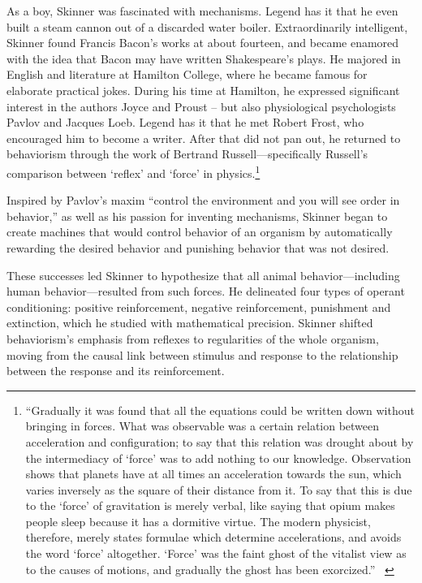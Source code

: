 \begin{refsection}
As a boy, Skinner was fascinated with mechanisms. Legend has it that he even built a steam cannon out of a discarded water boiler. Extraordinarily intelligent, Skinner found Francis Bacon's works at about fourteen, and became enamored with the idea that Bacon may have written Shakespeare's plays. He majored in English and literature at Hamilton College, where he became famous for elaborate practical jokes. During his time at Hamilton, he expressed significant interest in the authors Joyce and Proust – but also physiological psychologists Pavlov and Jacques Loeb. Legend has it that he met Robert Frost, who encouraged him to become a writer. After that did not pan out, he returned to behaviorism through the work of Bertrand Russell---specifically Russell's comparison between `reflex' and `force' in physics.\footnote{``Gradually it was found that all the equations could be written down without bringing in forces. What was observable was a certain relation between acceleration and configuration; to say that this relation was drought about by the intermediacy of `force' was to add nothing to our knowledge. Observation shows that planets have at all times an acceleration towards the sun, which varies inversely as the square of their distance from it. To say that this is due to the `force' of gravitation is merely verbal, like saying that opium makes people sleep because it has a dormitive virtue. The modern physicist, therefore, merely states formulae which determine accelerations, and avoids the word `force' altogether. `Force' was the faint ghost of the vitalist view as to the causes of motions, and gradually the ghost has been exorcized.'' ~\citep[p 495]{Russell:2013wy}}

Inspired by Pavlov's maxim ``control the environment and you will see order in behavior,'' as well as his passion for inventing mechanisms, Skinner began to create machines that would control behavior of an organism by automatically rewarding the desired behavior and punishing behavior that was not desired.

These successes led Skinner to hypothesize that all animal behavior---including human behavior---resulted from such forces. He delineated four types of operant conditioning: positive reinforcement, negative reinforcement, punishment and extinction, which he studied with mathematical precision. Skinner shifted behaviorism's emphasis from reflexes to regularities of the whole organism, moving from the causal link between stimulus and response to the relationship between the response and its reinforcement.


\end{refsection}
